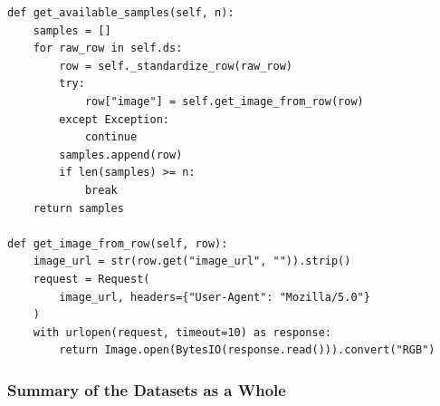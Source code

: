 ﻿\documentclass[11pt,a4paper]{article}
\begin{document}
\begin{lstlisting}[caption={Dataset standardisation from
\texttt{dataset/conceptual\_captions.py}.},label={lst:dataset-adapter}]
def get_available_samples(self, n):
    samples = []
    for raw_row in self.ds:
        row = self._standardize_row(raw_row)
        try:
            row["image"] = self.get_image_from_row(row)
        except Exception:
            continue
        samples.append(row)
        if len(samples) >= n:
            break
    return samples

def get_image_from_row(self, row):
    image_url = str(row.get("image_url", "")).strip()
    request = Request(
        image_url, headers={"User-Agent": "Mozilla/5.0"}
    )
    with urlopen(request, timeout=10) as response:
        return Image.open(BytesIO(response.read())).convert("RGB")
\end{lstlisting}




































































\subsubsection{Summary of the Datasets as a Whole}
\end{document}

